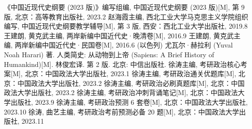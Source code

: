 \documentclass[10pt, UTF8]{ctexbook} %
\begin{document}
\newpage
\thispagestyle{empty}
\begin{thebibliography}{1}
    《中国近现代史纲要 (2023 版)》编写组编, 中国近现代史纲要 (2023 版)[M], 第 9 版, 
    北京：高等教育出版社, 2023.2
    赵海霞主编, 西北工业大学马克思主义学院组织编写, 中国近现代史纲要教学辅导[M], 第 3 版, 
    西安：西北工业大学出版社, 2019.8
    王建朗, 黄克武主编, 两岸新编中国近代史·晚清卷[M], 2016.9
    王建朗, 黄克武主编, 两岸新编中国近代史·民国卷[M], 2016.6
    (以色列) 尤瓦尔·赫拉利 (Yuval Noah Harari) 著. 人类简史: 从动物到上帝 (Sapiens: A Brief History
    of Humankind)[M]. 林俊宏译. 第 2 版.
    北京: 中信出版社.
    徐涛主编, 考研政治核心考案[M], 北京：中国政法大学出版社, 2023.1
    徐涛主编, 考研政治通关优题库[M], 北京：中国政法大学出版社, 2023.2
    徐涛主编, 考研政治必刷真题库[M], 北京：中国政法大学出版社, 2023.2
    徐涛主编, 考研政治冲刺背诵笔记[M], 北京：中国政法大学出版社, 2023.9
    徐涛主编, 考研政治预测 6 套卷[M], 北京：中国政法大学出版社, 2023.10
    徐涛, 曲艺主编, 考研政治考前预测必备 20 题[M], 北京：中国政法大学出版社, 2023.11
\end{thebibliography}




\newpage
\thispagestyle{empty}


\end{document}
